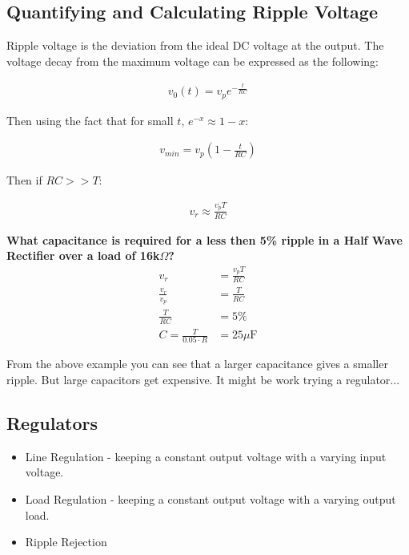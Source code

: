 \subsection{Quantifying and Calculating Ripple Voltage}

Ripple voltage is the deviation from the ideal DC voltage at the output. The voltage decay from the maximum voltage can be expressed as the following:

\begin{gather*}
v_0(t) = v_p e^{-\frac{t}{RC}}
\end{gather*}

Then using the fact that for small $t$, $e^{-x} \approx 1-x$:

\begin{gather*}
v_{min} = v_p\left(1 - \frac{t}{RC}\right)
\end{gather*}

Then if $RC >> T$:

\begin{gather*}
v_r \approx \frac{v_p T}{RC}
\end{gather*}

\begin{framed}
\textbf{What capacitance is required for a less then 5\% ripple in a Half Wave Rectifier over a load of 16k$\Omega$?}
\begin{align*}
v_r &= \frac{v_pT}{RC} \\
\frac{v_r}{v_p} &= \frac{T}{RC} \\
\frac{T}{RC} &= 5\% \\
C = \frac{T}{0.05 \cdot R} &= 25\mu\textrm{F}
\end{align*}
\end{framed}

From the above example you can see that a larger capacitance gives a smaller ripple. But large capacitors get expensive. It might be work trying a regulator...

\subsection{Regulators}

\begin{itemize}
	\item Line Regulation - keeping a constant output voltage with a varying input voltage.
	\item Load Regulation - keeping a constant output voltage with a varying output load.
	\item Ripple Rejection
\end{itemize}

